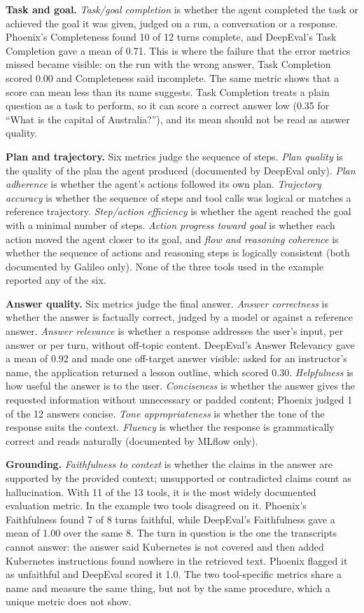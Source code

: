 \documentclass[conference]{IEEEtran}
\begin{document}
\textbf{Task and goal.} \emph{Task/goal completion} is whether the agent completed the task or achieved the goal it was given, judged on a run, a conversation or a response. Phoenix's Completeness found 10 of 12 turns complete, and DeepEval's Task Completion gave a mean of 0.71. This is where the failure that the error metrics missed became visible: on the run with the wrong answer, Task Completion scored 0.00 and Completeness said incomplete. The same metric shows that a score can mean less than its name suggests. Task Completion treats a plain question as a task to perform, so it can score a correct answer low (0.35 for ``What is the capital of Australia?''), and its mean should not be read as answer quality.

\textbf{Plan and trajectory.} Six metrics judge the sequence of steps. \emph{Plan quality} is the quality of the plan the agent produced (documented by DeepEval only). \emph{Plan adherence} is whether the agent's actions followed its own plan. \emph{Trajectory accuracy} is whether the sequence of steps and tool calls was logical or matches a reference trajectory. \emph{Step/action efficiency} is whether the agent reached the goal with a minimal number of steps. \emph{Action progress toward goal} is whether each action moved the agent closer to its goal, and \emph{flow and reasoning coherence} is whether the sequence of actions and reasoning steps is logically consistent (both documented by Galileo only). None of the three tools used in the example reported any of the six.

\textbf{Answer quality.} Six metrics judge the final answer. \emph{Answer correctness} is whether the answer is factually correct, judged by a model or against a reference answer. \emph{Answer relevance} is whether a response addresses the user's input, per answer or per turn, without off-topic content. DeepEval's Answer Relevancy gave a mean of 0.92 and made one off-target answer visible: asked for an instructor's name, the application returned a lesson outline, which scored 0.30. \emph{Helpfulness} is how useful the answer is to the user. \emph{Conciseness} is whether the answer gives the requested information without unnecessary or padded content; Phoenix judged 1 of the 12 answers concise. \emph{Tone appropriateness} is whether the tone of the response suits the context. \emph{Fluency} is whether the response is grammatically correct and reads naturally (documented by MLflow only).

\textbf{Grounding.} \emph{Faithfulness to context} is whether the claims in the answer are supported by the provided context; unsupported or contradicted claims count as hallucination. With 11 of the 13 tools, it is the most widely documented evaluation metric. In the example two tools disagreed on it. Phoenix's Faithfulness found 7 of 8 turns faithful, while DeepEval's Faithfulness gave a mean of 1.00 over the same 8. The turn in question is the one the transcripts cannot answer: the answer said Kubernetes is not covered and then added Kubernetes instructions found nowhere in the retrieved text. Phoenix flagged it as unfaithful and DeepEval scored it 1.0. The two tool-specific metrics share a name and measure the same thing, but not by the same procedure, which a unique metric does not show.
\end{document}
